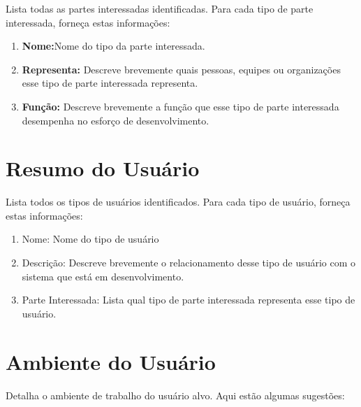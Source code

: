 \documentclass{report}
\begin{document}
Lista todas as partes interessadas identificadas. Para cada tipo de parte
interessada, forneça estas informações:

\begin{enumerate}

	\item
	      \textbf{Nome:}Nome do tipo da parte interessada.

	\item
	      \textbf{Representa: }Descreve brevemente quais pessoas, equipes ou organizações
	      esse tipo de parte interessada representa.

	\item
	      \textbf{Função:} Descreve brevemente a função que esse tipo de parte
	      interessada desempenha no esforço de desenvolvimento.

\end{enumerate}

\section{Resumo do Usuário}

Lista todos os tipos de usuários identificados. Para cada tipo de usuário,
forneça estas informações:

\begin{enumerate}

	\item
	      Nome: Nome do tipo de usuário

	\item
	      Descrição: Descreve brevemente o relacionamento desse tipo de usuário com o
	      sistema que está em desenvolvimento.

	\item
	      Parte Interessada: Lista qual tipo de parte interessada representa esse tipo de
	      usuário.

\end{enumerate}

\section{Ambiente do Usuário}

Detalha o ambiente de trabalho do usuário alvo. Aqui estão algumas sugestões:
\end{document}
